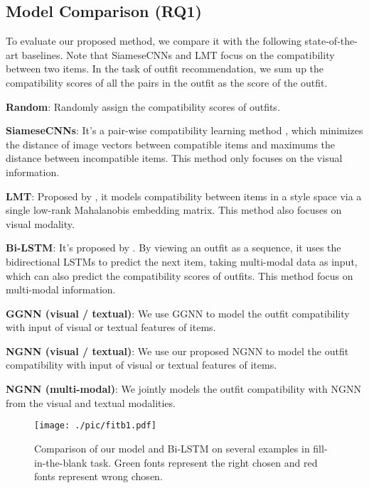 \documentclass[sigconf]{acmart}
\begin{document}
\subsection{Model Comparison (RQ1)}


To evaluate our proposed method, we compare it with the following state-of-the-art baselines. Note that SiameseCNNs and LMT focus on the compatibility between two items. In the task of outfit recommendation, we sum up the compatibility scores of all the pairs in the outfit as the score of the outfit.



\noindent\textbf{Random}: Randomly assign the compatibility scores of outfits.

\noindent\textbf{SiameseCNNs}: It's a pair-wise compatibility learning method \cite{veit2015learning}, which minimizes the distance of image vectors between compatible items and maximums the distance between incompatible items. This method only focuses on the visual information.

\noindent\textbf{LMT}: Proposed by \cite{mcauley2015image}, it models compatibility between items in a style space via a single low-rank Mahalanobis embedding matrix. This method also focuses on visual modality.

\noindent\textbf{Bi-LSTM}: It's proposed by \cite{han2017learning}. By viewing an outfit as a sequence, it uses the bidirectional LSTMs to predict the next item, taking multi-modal data as input, which can also predict the compatibility scores of outfits. This method focus on multi-modal information.

 \noindent\textbf{GGNN (visual / textual)}: We use GGNN to model the outfit compatibility with input of visual or textual features of items.

\noindent\textbf{NGNN (visual / textual)}: We use our proposed NGNN to model the outfit compatibility with input of visual or textual features of items.

\noindent\textbf{NGNN (multi-modal)}: We jointly models the outfit compatibility with NGNN from the visual and textual modalities.

\begin{figure}[t]
  \centering
\texttt{[image: ./pic/fitb1.pdf]}
  \caption{Comparison of our model and Bi-LSTM on several examples in fill-in-the-blank task. Green fonts represent the right chosen and red fonts represent wrong chosen. }\label{fig:fill_blank}
\end{figure}
\end{document}
